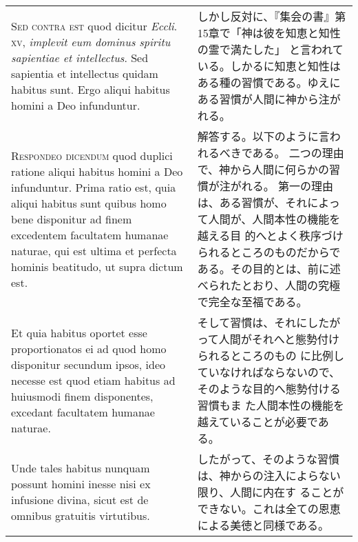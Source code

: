 \documentclass[10pt]{jsarticle} %
\begin{document}
\begin{longtable}{p{21em}p{21em}}
\\



{\scshape Sed contra est} quod dicitur {\itshape Eccli}.~{\scshape
xv}, {\itshape implevit eum dominus spiritu sapientiae et
intellectus}. Sed sapientia et intellectus quidam habitus sunt. Ergo
aliqui habitus homini a Deo infunduntur.

&

しかし反対に、『集会の書』第15章で「神は彼を知恵と知性の霊で満たした」
 と言われている。しかるに知恵と知性はある種の習慣である。ゆえにある習慣が人間に神から注がれる。

\\



{\scshape Respondeo dicendum} quod duplici ratione aliqui habitus homini a Deo
infunduntur. Prima ratio est, quia aliqui habitus sunt quibus homo
bene disponitur ad finem excedentem facultatem humanae naturae, qui
est ultima et perfecta hominis beatitudo, ut supra dictum est. 

&


解答する。以下のように言われるべきである。
二つの理由で、神から人間に何らかの習慣が注がれる。
第一の理由は、ある習慣が、それによって人間が、人間本性の機能を越える目
的へとよく秩序づけられるところのものだからである。その目的とは、前に述
 べられたとおり、人間の究極で完全な至福である。

\\

Et quia
habitus oportet esse proportionatos ei ad quod homo disponitur
secundum ipsos, ideo necesse est quod etiam habitus ad huiusmodi finem
disponentes, excedant facultatem humanae naturae. 

&

そして習慣は、それにしたがって人間がそれへと態勢付けられるところのもの
 に比例していなければならないので、そのような目的へ態勢付ける習慣もま
 た人間本性の機能を越えていることが必要である。

\\

Unde tales habitus
nunquam possunt homini inesse nisi ex infusione divina, sicut est de
omnibus gratuitis virtutibus. 

&

したがって、そのような習慣は、神からの注入によらない限り、人間に内在す
 ることができない。これは全ての恩恵による美徳と同様である。


\\


\end{longtable}
\end{document}

